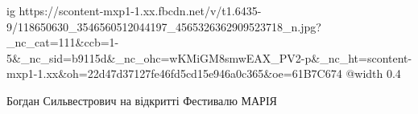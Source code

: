  
 
 
 
 

\ifcmt
  ig https://scontent-mxp1-1.xx.fbcdn.net/v/t1.6435-9/118650630_3546560512044197_4565326362909523718_n.jpg?_nc_cat=111&ccb=1-5&_nc_sid=b9115d&_nc_ohc=wKMiGM8smwEAX_PV2-p&_nc_ht=scontent-mxp1-1.xx&oh=22d47d37127fe46fd5cd15e946a0c365&oe=61B7C674
  @width 0.4
\fi


Богдан Сильвестрович на відкритті Фестивалю МАРІЯ
